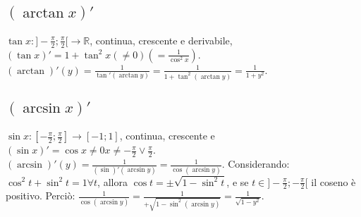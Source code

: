 \subsection{$(\arctan x)'$}
$\tan x:]-\frac{\pi}{2};\frac{\pi}{2}[\rightarrow\mathbb{R}$, continua, crescente e derivabile, $(\tan x)'=1+\tan^2 x(\neq0)(=\frac{1}{\cos^2 x})$.\\
$(\arctan)'(y)=\frac{1}{\tan'(\arctan y)}=\frac{1}{1+\tan^2(\arctan y)}=\frac{1}{1+y^2}$.
\subsection{$(\arcsin x)'$}
$\sin x:[-\frac{\pi}{2};\frac{\pi}{2}]\rightarrow[-1;1]$, continua, crescente e $(\sin x)'=\cos x\neq 0 x\neq -\frac{\pi}{2}\lor \frac{\pi}{2}$.\\
$(\arcsin)'(y)=\frac{1}{(\sin)'(\arcsin y)}=\frac{1}{\cos(\arcsin y)}$. Considerando: $\cos^2 t+\sin^2 t=1 \forall t$, allora $\cos t=\pm\sqrt{1-\sin^2 t}$, e se $t\in]-
\frac{\pi}{2};-\frac{\pi}{2}[$ il coseno \`e positivo. Perci\`o: $\frac{1}{\cos(\arcsin y)}=\frac{1}{+\sqrt{1-\sin^2(\arcsin y)}}=\frac{1}{\sqrt{1-y^2}}$.